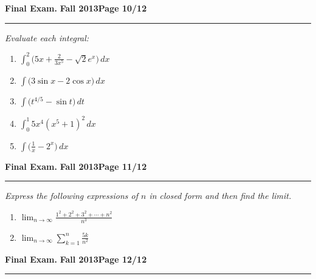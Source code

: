 \documentclass[12pt]{article}
\begin{document}
{%
\hfill{\large\bf Final Exam.}\hfill{\large\bf
  Fall 2013}\hfill{\large\bf Page 10/12}\hrule

\bigskip
{\problem[25 pts] \em  Evaluate each integral:} 
\begin{enumerate}
\item $\displaystyle{\int_0^2 \big( 5x + \frac{2}{3x^5} - \sqrt{2} e^x \big)\, dx}$
\vspace{3cm}
\item $\displaystyle{\int \big( 3\sin x - 2\cos x \big)\, dx}$
\vspace{3cm}
\item $\displaystyle{\int \big( t^{4/5} - \sin t\big)\, dt}$
\vspace{3cm}
\item $\displaystyle{\int_0^1 5x^4 (x^5+1)^2\, dx}$
\vspace{3cm}
\item $\displaystyle{\int \big( \tfrac{1}{x} - 2^x \big)\, dx}$

\end{enumerate}
\newpage

\hfill{\large\bf Final Exam.}\hfill{\large\bf
  Fall 2013}\hfill{\large\bf Page 11/12}\hrule

\bigskip
{\problem[30 pts] \em Express the following expressions of $n$ in closed
  form and then find the limit.}
\begin{enumerate}
\item  $\displaystyle{\lim_{n \to \infty} \frac{1^2+2^2+3^2+ \dotsb +
      n^2}{n^3}}$
\vspace{9cm}
\item  $\displaystyle{\lim_{n \to \infty} \sum_{k=1}^n \frac{5k}{n^2}}$
\vspace{9cm}
\end{enumerate}
\newpage

\hfill{\large\bf Final Exam.}\hfill{\large\bf
  Fall 2013}\hfill{\large\bf Page 12/12}\hrule

}
\end{document}
